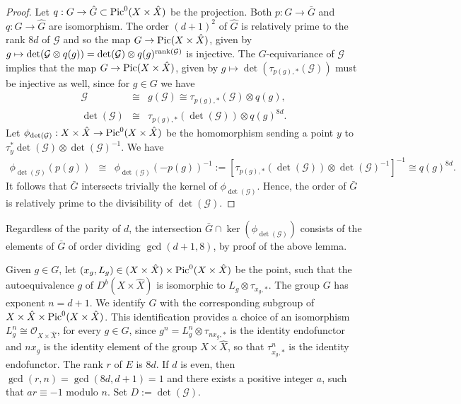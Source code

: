 \documentclass[12pt]{amsart}
\numberwithin{equation}{subsection}
\theoremstyle{plain}
\theoremstyle{definition}
\newtheorem{rem}[thm]{Remark}
\newcommand{\E}{{\mathcal E}}
\newcommand{\G}{{\mathcal G}}
\newcommand{\StructureSheaf}[1]{{\mathcal O}_{#1}}
\newcommand{\rank}{{\rm rank}}
\newcommand{\Pic}{{\rm Pic}}
\begin{document}
\begin{proof}
Let $q:G\rightarrow \hat{G}\subset \Pic^0(X\times\hat{X})$ be the projection.
Both $p:G\rightarrow \bar{G}$ and $q:G\rightarrow \hat{G}$ are isomorphism.
The order $(d+1)^2$ of $\hat{G}$ is relatively prime to the rank $8d$ of $\G$ and so the map
$G\rightarrow\Pic(X\times\hat{X})$, given by $g\mapsto \det(\G\otimes q(g))=\det(\G)\otimes q(g)^{\rank(\G)}$ is injective. The $G$-equivariance of $\G$ implies 
that the map $G\rightarrow \Pic(X\times\hat{X})$, given by $g\mapsto \det(\tau_{p(g),*}(\G))$ must be injective as well, since for $g\in G$ we have
\begin{eqnarray*}
\G&\cong& g(\G)\cong \tau_{p(g),*}(\G)\otimes q(g),
\\
\det(\G)&\cong & \tau_{p(g),*}(\det(\G))\otimes q(g)^{8d}.
\end{eqnarray*}
Let $\phi_{\det(\G)}:X\times\hat{X}\rightarrow \Pic^0(X\times\hat{X})$ be the homomorphism sending a point $y$ to $\tau_y^*\det(\G)\otimes\det(\G)^{-1}$.
We have
\begin{eqnarray*}
\phi_{\det(\G)}(p(g))&\cong& \phi_{\det(\G)}(-p(g))^{-1}:= [\tau_{p(g),*}(\det(\G))\otimes\det(\G)^{-1}]^{-1}\cong q(g)^{8d}. 
\end{eqnarray*}
It follows that $\bar{G}$ intersects trivially the kernel of $\phi_{\det(\G)}$.
Hence, the order of $\bar{G}$ is relatively prime to the divisibility of $\det(\G)$.
\end{proof}

Regardless of the parity of $d$, the intersection $\bar{G}\cap \ker(\phi_{\det(\G)})$ consists of the elements of $\bar{G}$ of order dividing $\gcd(d+1,8)$, by proof of the above lemma.



Given $g\in G$, let $(x_g,L_g)\in (X\times\hat{X})\times \Pic^0(X\times\hat{X})$ be the point, such that the autoequivalence $g$ of $D^b(X\times\hat{X})$
is isomorphic to $L_g\otimes \tau_{x_g,*}$. The group $G$ has exponent $n=d+1$. 
We identify $G$ with the corresponding subgroup of $X\times\hat{X}\times \Pic^0(X\times\hat{X})$. 
This identification provides a choice of an isomorphism $L_g^n\cong \StructureSheaf{X\times\hat{X}}$, for every $g\in G$, since $g^n=L_g^n\otimes\tau_{nx_g,*}$ is the identity endofunctor and $nx_g$ is the identity element of the group $X\times\hat{X}$, so that $\tau_{x_g,*}^n$ is the identity endofunctor. 
The rank $r$ of $E$ is $8d$. 
If $d$ is even, then $\gcd(r,n)=\gcd(8d,d+1)=1$ and there exists a positive integer $a$, such that $ar\equiv -1$ modulo $n$.
Set $D:=\det(\G)$.
\end{document}
